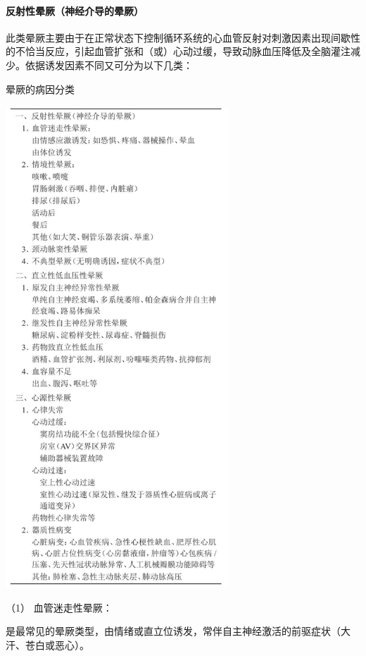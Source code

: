 \paragraph{反射性晕厥（神经介导的晕厥）}

此类晕厥主要由于在正常状态下控制循环系统的心血管反射对刺激因素出现间歇性的不恰当反应，引起血管扩张和（或）心动过缓，导致动脉血压降低及全脑灌注减少。依据诱发因素不同又可分为以下几类：

\begin{table}[htbp]
\centering
\caption{晕厥的病因分类}
\label{tab4-1}
\includegraphics[width=3.30208in,height=7.11458in]{./images/Image00017.jpg}
\end{table}

\hypertarget{text00014.htmlux5cux23CHP1-4-1-1-1}{}
（1） 血管迷走性晕厥：

是最常见的晕厥类型，由情绪或直立位诱发，常伴自主神经激活的前驱症状（大汗、苍白或恶心）。

